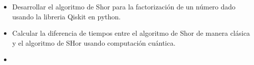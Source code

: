 \begin{itemize}
    \item Desarrollar el algoritmo de Shor para la factorización de un número dado usando la libreria Qiskit en python.
    \item Calcular la diferencia de tiempos entre el algoritmo de Shor de manera clásica y el algoritmo de SHor usando computación cuántica.
    \item 
\end{itemize}